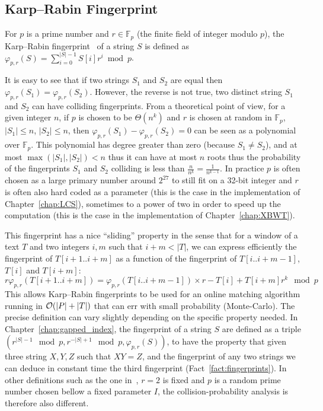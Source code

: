 \subsection{Karp--Rabin Fingerprint}\label{sec:prelim:KR}

For $p$ is a prime number and $r \in \mathbb{F}_p$ (the finite field of integer modulo $p$), the Karp--Rabin fingerprint~\cite{DBLP:journals/ibmrd/KarpR87} of a string $S$ is defined as
$\varphi_{p,r}(S) = \sum_{i = 0}^{|S|-1}  S[i]r^{i} \bmod p$.

It is easy to see that if two strings $S_1$ and $S_2$ are equal then $\varphi_{p,r}(S_1) = \varphi_{p,r}(S_2)$. However, the reverse is not true, two distinct string $S_1$ and $S_2$ can have colliding fingerprints.
From a theoretical point of view, for a given integer $n$, if $p$ is chosen to be $\Theta(n^k)$ and $r$ is chosen at random in $\mathbb{F}_p$, $|S_1|\leq n$, $|S_2|\leq n$, then $\varphi_{p,r}(S_1) - \varphi_{p,r}(S_2) = 0$ can be seen as a polynomial over $\mathbb{F}_p$. This polynomial has degree greater than zero (because $S_1 \neq S_2$), and at most $\max(|S_1|,|S_2|) < n$ thus it can have at most $n$ roots thus the probability of the fingerprints $S_1$ and $S_2$ colliding is less than $\frac{n}{n^k} = \frac{1}{n^{k-1}}$.
In practice $p$ is often chosen as a large primary number around $2^{27}$ to still fit on a 32-bit integer and $r$ is often also hard coded as a parameter (this is the case in the implementation of Chapter~\ref{chap:LCS}), sometimes to a power of two in order to speed up the computation (this is the case in the implementation of Chapter~\ref{chap:XBWT}).

This fingerprint has a nice ``sliding'' property in the sense that for a window of a text $T$ and two integers $i,m$ such that $i+m < |T|$, we can express efficiently the fingerprint of $T[i+1..i+m]$ as a function of the fingerprint of $T[i..i+m-1]$, $T[i]$ and $T[i+m]$:
$$ r \varphi_{p,r}(T[i+1..i+m]) = \varphi_{p,r}(T[i..i+m-1])\times r - T[i] + T[i+m]r^k \mod p$$
This allows Karp--Rabin fingerprints to be used for an online matching algorithm running in $\mathcal{O}(|P|+|T|)$ that can err with small probability (Monte-Carlo).
The precise definition can vary slightly depending on the specific property needed. In Chapter~\ref{chap:gapped_index}, the fingerprint of a string $S$ are defined as a triple $(r^{|S|-1} \mod p, r^{-|S|+1} \mod p, \varphi_{p,r}(S))$, to have the property that given three string $X,Y,Z$ such that $XY =Z$, and the fingerprint of any two strings we can deduce in constant time the third fingerprint (Fact~\ref{fact:fingerprints}). In other definitions such as the one in~\cite{Gusfield1997}, $r=2$ is fixed and $p$ is a random prime number chosen bellow a fixed parameter $I$, the collision-probability  analysis is therefore also different.

